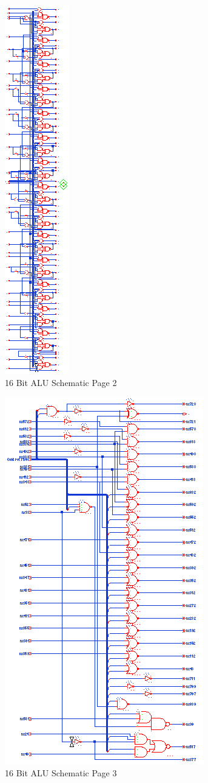 \documentclass[11pt]{article}
\begin{document}
			\begin{figure}[H]
				\centering
				\includegraphics[width=0.2\linewidth]{"Pictures/ALU-16Bit Schematic 2"}
				\caption{16 Bit ALU Schematic Page 2}
				\label{fig:alu-16bit-schematic-2}
			\end{figure}
		
			\begin{figure}[H]
				\centering
				\includegraphics[width=0.4\linewidth]{"Pictures/ALU-16Bit Schematic 3"}
				\caption{16 Bit ALU Schematic Page 3}
				\label{fig:alu-16bit-schematic-3}
			\end{figure}
\end{document}
